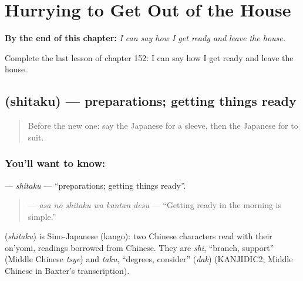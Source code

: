 
\chapter{Hurrying to Get Out of the House}
\label{ch:ja-hurrying-to-get-out-of-the-house}

\begin{chapteropening}
\textbf{By the end of this chapter:} \emph{I can say how I get ready and leave the house.}

Complete the last lesson of chapter 152: I can say how I get ready and leave the house.
\end{chapteropening}

\section[\texorpdfstring{\ja{したく} (shitaku)}{したく (shitaku)}]{ (shitaku) — preparations; getting things ready}

\label{lesson:JA-C152-shitaku}



\begin{quote}
Before the new one: say the Japanese for a sleeve, then the Japanese for to suit.
\end{quote}

\subsection*{You'll want to know: }
\textbf{} — \emph{shitaku} — \textquotedblleft{}preparations; getting things ready\textquotedblright{}.

\begin{quote}
\textbf{  } — \emph{asa no shitaku wa kantan desu} — \textquotedblleft{}Getting ready in the morning is simple.\textquotedblright{}
\end{quote}

\begin{cousinweb}
\textbf{} (\emph{shitaku}) is Sino-Japanese (kango): two Chinese characters read with their on'yomi, readings borrowed from Chinese. They are \emph{shi}, \textquotedblleft{}branch, support\textquotedblright{} (Middle Chinese \emph{tsye}) and \emph{taku}, \textquotedblleft{}degrees, consider\textquotedblright{} (\emph{dak}) (KANJIDIC2; Middle Chinese in Baxter's transcription).
\end{cousinweb}


